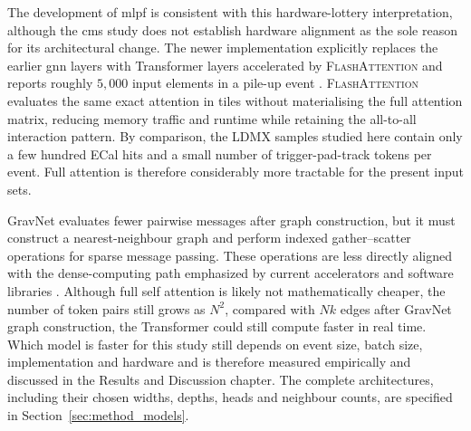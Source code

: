 The development of \gls{mlpf} is consistent with this hardware-lottery
interpretation, although the \gls{cms} study does not establish hardware alignment
as the sole reason for its architectural change. The newer implementation
explicitly replaces the earlier \gls{gnn} layers with Transformer layers accelerated
by \textsc{FlashAttention} and reports roughly \(5{,}000\) input elements in a
pile-up event \cite{pata2026-mlpf}. \textsc{FlashAttention} evaluates the same
exact attention in tiles without materialising the full attention matrix,
reducing memory traffic and runtime while retaining the all-to-all interaction
pattern. By comparison, the LDMX samples studied here contain only a few
hundred ECal hits and a small number of trigger-pad-track tokens per event.
Full attention is therefore considerably more tractable for the present input
sets.

GravNet evaluates fewer pairwise messages after graph construction, but it
must construct a nearest-neighbour graph and perform indexed gather--scatter
operations for sparse message passing. These operations are less directly
aligned with the dense-computing path emphasized by current accelerators and
software libraries \cite{fey2019-pytorch-geometric}. Although full self attention is likely not mathematically cheaper, the number of token pairs still grows as \(N^2\), compared with \(Nk\) edges
after GravNet graph construction, the Transformer could still compute faster in real time. Which model is
faster for this study still depends on event size, batch size, implementation
and hardware and is therefore measured empirically and discussed in the Results and Discussion chapter.
The complete architectures, including their chosen widths, depths, heads and
neighbour counts, are specified in Section~\ref{sec:method_models}.





